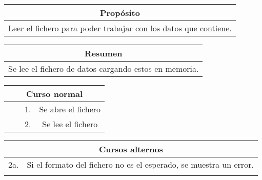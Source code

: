 \begin{table}[!h]
\begin{tabular}{|c|}
\hline
\cellcolor{cyan} \textbf{Propósito} \\
\hline
 Leer el fichero para poder trabajar con los datos que contiene.                  \\
\hline
\end{tabular}
\end{table}

\begin{table}[!h]
\begin{tabular}{|c|}
\hline
\cellcolor{cyan} \textbf{Resumen}  \\
\hline
 Se lee el fichero de datos cargando estos en memoria.                  \\
\hline
\end{tabular}
\end{table}

\begin{table}[!h]
\begin{tabular}{|c|c|c|c|}
\hline
\multicolumn{4}{|c|}{\cellcolor{cyan} \textbf{Curso normal}} \\
\hline
              &               &      1.        &     Se abre el fichero         \\
\hline
              &               &      2.        &     Se lee el fichero         \\
\hline
\end{tabular}
\end{table}

\begin{table}[!h]
\begin{tabular}{|c|c|}
\hline
\multicolumn{2}{|c|}{\cellcolor{cyan} \textbf{Cursos alternos}} \\
\hline
    2a.          &      Si el formato del fichero no es el esperado, se muestra un error.        \\
\hline
              &              \\
\hline
\end{tabular}
\end{table}

